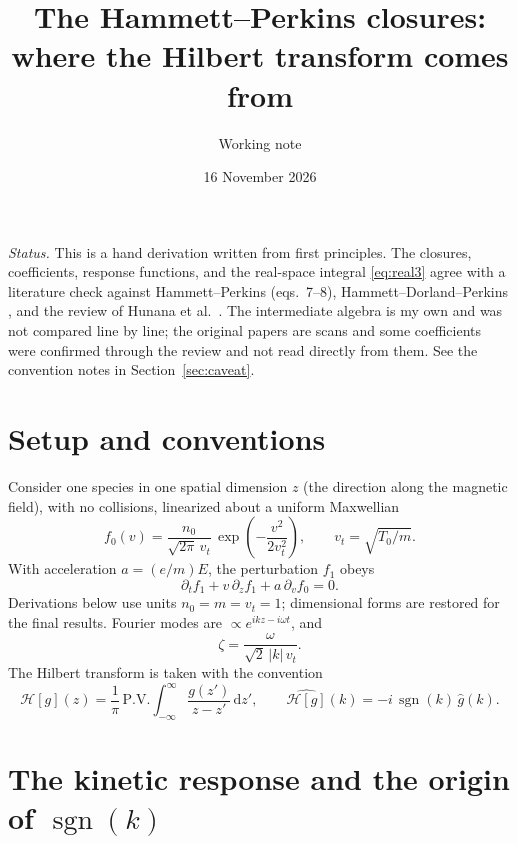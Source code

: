 \documentclass[11pt]{article}
\title{The Hammett--Perkins closures:\\ where the Hilbert transform comes from}
\author{Working note}
\date{16 November 2026}
\newcommand{\sgn}{\operatorname{sgn}}
\newcommand{\PV}{\mathrm{P.V.}\!\!}
\newcommand{\Hil}{\mathcal{H}}
\newcommand{\dd}{\mathrm{d}}
\newcommand{\vt}{v_t}
\begin{document}
\maketitle

\noindent\emph{Status.} This is a hand derivation written from first
principles. The closures, coefficients, response functions, and the
real-space integral \eqref{eq:real3} agree with a literature check against
Hammett--Perkins \cite{HP90} (eqs.~7--8), Hammett--Dorland--Perkins
\cite{HDP92}, and the review of Hunana et al.\ \cite{Hunana19}. The
intermediate algebra is my own and was not compared line by line; the
original papers are scans and some coefficients were confirmed through the
review and not read directly from them. See the convention notes in
Section~\ref{sec:caveat}.

\section{Setup and conventions}

Consider one species in one spatial dimension $z$ (the direction along the
magnetic field), with no collisions, linearized about a uniform Maxwellian
\[
  f_0(v) = \frac{n_0}{\sqrt{2\pi}\,\vt}\,
           \exp\!\left(-\frac{v^2}{2\vt^2}\right),
  \qquad \vt = \sqrt{T_0/m}.
\]
With acceleration $a = (e/m)E$, the perturbation $f_1$ obeys
\begin{equation}
  \partial_t f_1 + v\,\partial_z f_1 + a\,\partial_v f_0 = 0 .
  \label{eq:vlasov}
\end{equation}
Derivations below use units $n_0 = m = \vt = 1$; dimensional forms are
restored for the final results. Fourier modes are $\propto e^{ikz - i\omega t}$,
and
\begin{equation}
  \zeta = \frac{\omega}{\sqrt{2}\,|k|\,\vt}.
  \label{eq:zeta}
\end{equation}
The Hilbert transform is taken with the convention
\begin{equation}
  \Hil[g](z) = \frac{1}{\pi}\,\PV\int_{-\infty}^{\infty}
               \frac{g(z')}{z - z'}\,\dd z',
  \qquad
  \widehat{\Hil[g]}(k) = -i\,\sgn(k)\,\hat g(k).
  \label{eq:hilbert}
\end{equation}

\section{The kinetic response and the origin of $\sgn(k)$}
\end{document}
